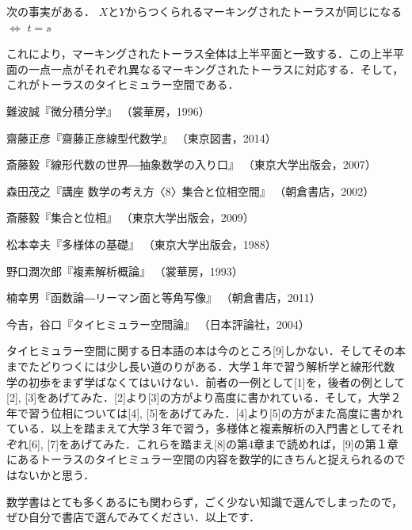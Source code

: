 次の事実がある．
\thm
$X$と$Y$からつくられるマーキングされたトーラスが同じになる\\
$\Leftrightarrow $ $t=s$
\thmx
\begin{figure}[h]
\begin{minipage}{0.5\hsize}
\end{minipage}
\begin{minipage}{0.5\hsize}
\end{minipage}
\end{figure}
これにより，マーキングされたトーラス全体は上半平面と一致する．この上半平面の一点一点がそれぞれ異なるマーキングされたトーラスに対応する．そして，これがトーラスのタイヒミュラー空間である．
\begin{thebibliography}{9}
\item
難波誠『微分積分学』
（裳華房，1996）
\item
齋藤正彦『齋藤正彦線型代数学』
（東京図書，2014）
\item
斎藤毅『線形代数の世界―抽象数学の入り口』
（東京大学出版会，2007）
\item
森田茂之『講座 数学の考え方〈8〉集合と位相空間』
（朝倉書店，2002）
\item
斎藤毅『集合と位相』
（東京大学出版会，2009）
\item
松本幸夫『多様体の基礎』
（東京大学出版会，1988）
\item
野口潤次郎『複素解析概論』
（裳華房，1993）
\item
楠幸男『函数論―リーマン面と等角写像』
（朝倉書店，2011）
\item
今吉，谷口『タイヒミュラー空間論』
（日本評論社，2004）
\end{thebibliography}

タイヒミュラー空間に関する日本語の本は今のところ[9]しかない．そしてその本までたどりつくには少し長い道のりがある．大学１年で習う解析学と線形代数学の初歩をまず学ばなくてはいけない．前者の一例として[1]を，後者の例として[2], [3]をあげてみた．[2]より[3]の方がより高度に書かれている．そして，大学２年で習う位相については[4], [5]をあげてみた．[4]より[5]の方がまた高度に書かれている．以上を踏まえて大学３年で習う，多様体と複素解析の入門書としてそれぞれ[6], [7]をあげてみた．これらを踏まえ[8]の第4章まで読めれば，[9]の第１章にあるトーラスのタイヒミュラー空間の内容を数学的にきちんと捉えられるのではないかと思う．

数学書はとても多くあるにも関わらず，ごく少ない知識で選んでしまったので，ぜひ自分で書店で選んでみてください．以上です．







